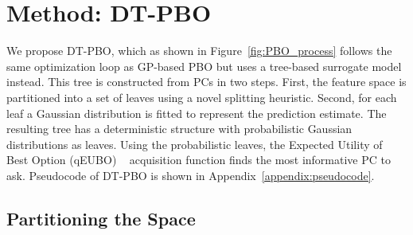 \documentclass{article}
\begin{document}
\section{Method: DT-PBO}\label{sec:method}
We propose DT-PBO, which as shown in Figure~\ref{fig:PBO_process} follows the same optimization loop as GP-based PBO but uses a tree-based surrogate model instead. This tree is constructed from PCs in two steps. First, the feature space is partitioned into a set of leaves using a novel splitting heuristic. Second, for each leaf a Gaussian distribution is fitted to represent the prediction estimate. The resulting tree has a deterministic structure with probabilistic Gaussian distributions as leaves. Using the probabilistic leaves, the Expected Utility of Best Option (qEUBO) ~\cite{astudillo2023qeubodecisiontheoreticacquisitionfunction} acquisition function finds the most informative PC to ask. Pseudocode of DT-PBO is shown in Appendix~\ref{appendix:pseudocode}.

\subsection{Partitioning the Space}\label{sec:partitioning}
\end{document}
